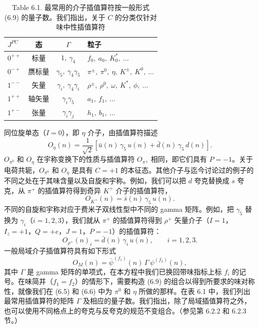 \begin{table}[htbp]
  \centering
  \caption*{Table 6.1. 最常用的介子插值算符按一般形式 (6.9) 的量子数。我们指出，关于 $C$ 的分类仅针对味中性插值算符}
  \begin{tabular}{@{}l c c l@{}}
    \toprule
    $J^{PC}$ & 态 & $\Gamma$ & 粒子 \\
    \midrule
    $0^{++}$ & 标量 & $1,\ \gamma_4$ & $f_0,\ a_0,\ K_0^*,\ \ldots$ \\
    $0^{-+}$ & 赝标量 & $\gamma_5,\ \gamma_4\gamma_5$
      & $\pi^\pm,\ \pi^0,\ \eta,\ K^\pm,\ K^0,\ \ldots$ \\
    $1^{--}$ & 矢量 & $\gamma_i,\ \gamma_4\gamma_i$
      & $\rho^\pm,\ \rho^0,\ \omega,\ K^*,\ \phi,\ \ldots$ \\
    $1^{++}$ & 轴矢量 & $\gamma_i\gamma_5$ & $a_1,\ f_1,\ \ldots$ \\
    $1^{+-}$ & 张量 & $\gamma_i\gamma_j$ & $h_1,\ b_1,\ \ldots$ \\
    \bottomrule
  \end{tabular}
\end{table}

同位旋单态（$I = 0$），即 $\eta$ 介子，由插值算符描述
\begin{equation}
  O_{\eta}(n) = \frac{1}{\sqrt{2}}\left[ \bar u(n)\, \gamma_5\, u(n)
    + \bar d(n)\, \gamma_5\, d(n) \right].
\end{equation}
$O_{\pi^0}$ 和 $O_\eta$ 在宇称变换下的性质与插值算符 $O_{\pi^\pm}$ 相同，即它们具有 $P = -1$。关于电荷共轭，$O_{\pi^0}$ 和 $O_\eta$ 是具有 $C = +1$ 的本征态。其他介子与迄今讨论过的例子的不同之处在于其味含量以及自旋和宇称。例如，我们可以把 $d$ 夸克替换成 $s$ 夸克，从 $\pi^+$ 的插值算符得到奇异 $K^+$ 介子的插值算符，
\begin{equation}
  O_{K^+}(n) = \bar s(n)\, \gamma_5\, u(n) .
\end{equation}
不同的自旋和宇称对应于费米子双线性型中不同的 gamma 矩阵。例如，把 $\gamma_5$ 替换为 $\gamma_i$（$i = 1, 2, 3$），我们就从 $\pi^+$ 的插值算符得到 $\rho^+$ 矢量介子（$I = 1$，$I_z = +1$，$Q = +e$，$J = 1$，$P = -1$）的插值算符：
\begin{equation}
  O_{\rho^+}(n)_i = \bar d(n)\, \gamma_i\, u(n) , \qquad i = 1, 2, 3 .
\end{equation}
一般局域介子插值算符具有如下形式
\begin{equation}
  O_M(n) = \bar\psi^{(f_1)}(n)\, \Gamma\, \psi^{(f_2)}(n) ,
\end{equation}
其中 $\Gamma$ 是 gamma 矩阵的单项式，在本方程中我们已换回带味指标上标 $f_i$ 的记号。在味简并（$f_1 = f_2$）的情形下，需要构造 (6.9) 的组合以得到所要求的味对称性，就像我们在 (6.5) 和 (6.6) 中为 $\pi^0$ 和 $\eta$ 所做的那样。在表 6.1 中，我们列出最常用插值算符的矩阵 $\Gamma$ 及相应的量子数。我们指出，除了局域插值算符之外，也可以使用不同格点上的夸克与反夸克的规范不变组合。（参见第 6.2.2 和 6.2.3 节。）

